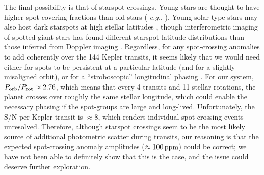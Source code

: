 \documentclass[12pt,modern,twocolumn,tighten]{aastex63}
\begin{document}
The final possibility is that of starspot crossings.  Young stars are
thought to have higher spot-covering fractions than old stars ({\it
e.g.}, \citealt{morris_relationship_2020}).  Young solar-type stars may also host
dark starspots at high stellar latitudes \citep[{\it e.g.},
EK~Dra;][]{strassmeier_starspots_2009}, though interferometric imaging
of spotted giant stars has found different starspot latitude distributions than
those inferred from Doppler imaging
\citep{roettenbacher_contemporaneous_2017}.  Regardless, for any
spot-crossing anomalies to add coherently over the 144 Kepler
transits, it seems likely that we would need either for spots to be
persistent at a particular latitude (and for a slightly misaligned
orbit), or for a ``stroboscopic'' longitudinal phasing \citep[{\it
e.g.},][]{dai_stellar_2018}.  For our system, $P_{\rm orb}/P_{\rm rot}
\approx 2.76$, which means that every 4 transits and 11 stellar
rotations, the planet crosses over roughly the same stellar longitude,
which could enable the necessary phasing if the spot-groups are
large and long-lived.  Unfortunately, the  S/N per Kepler transit is
$\approx8$, which renders individual spot-crossing events unresolved.
Therefore, although starspot crossings seem to be
the most likely source of additional photometric scatter
during transits, our reasoning is that the expected
spot-crossing anomaly amplitudes ($\approx 100\,{\rm ppm}$) could be
correct; we have not been able to definitely show that this is the case, and 
the issue could deserve further exploration.


%  
%  
\end{document}
